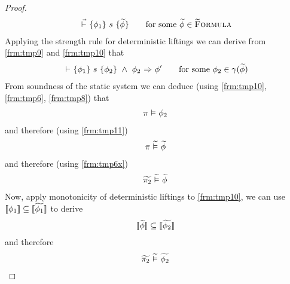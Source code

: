 \begin{proof}
    \begin{align}
    {} \,\,\vec{\vdash}\,\, \{{\phi_1}\} ~{s}~ \{{\widetilde{\phi}}\}
    \quad\quad\text{for some } \widetilde{\phi} \in \textup{\textsc{\ensuremath{\widetilde{\text{F}}}ormula}}
    \label{frm:tmp10}
    \end{align}
    Applying the strength rule for deterministic liftings we can derive from \ref{frm:tmp9} and \ref{frm:tmp10} that
    \begin{align}
    {} \,\,{\vdash}\,\, \{{\phi_1}\} ~{s}~ \{{\phi_2}\} ~\wedge~ {\phi_2} \,\,{\Rightarrow}\,\, {\phi'}
    \quad\quad\text{for some } \phi_2 \in \gamma(\widetilde{\phi})
    \label{frm:tmp11}
    \end{align}
    From soundness of the static system we can deduce (using \ref{frm:tmp10}, \ref{frm:tmp6}, \ref{frm:tmp8}) that
    \begin{align}
    \pi \,\,{\vDash}\,\, \phi_2
    \label{frm:tmp12}
    \end{align}
    and therefore (using \ref{frm:tmp11})
    \begin{align}
    \pi \,\,\widetilde{\vDash}\,\, \widetilde{\phi}
    \label{frm:tmp13}
    \end{align}
    and therefore (using \ref{frm:tmp6x})
    \begin{align}
    \widetilde{\pi_2} \,\,\widetilde{\vDash}\,\, \widetilde{\phi}
    \label{frm:tmp14}
    \end{align}
    Now, apply monotonicity of deterministic liftings to \ref{frm:tmp10}, we can use $\llbracket \phi_1 \rrbracket \subseteq \llbracket \widetilde{\phi_1} \rrbracket$ to derive
    \begin{align}
    \llbracket \widetilde{\phi} \rrbracket \subseteq \llbracket \widetilde{\phi_2} \rrbracket
    \label{frm:tmp15}
    \end{align}
    and therefore
    \begin{align}
    \widetilde{\pi_2} \,\,\widetilde{\vDash}\,\, \widetilde{\phi_2}
    \label{frm:tmp16}
    \end{align}
\end{proof}
 
